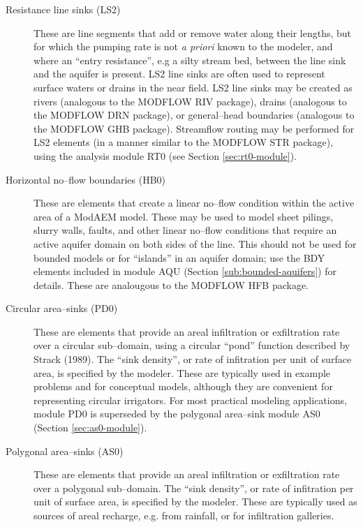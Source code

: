 \begin{description}
\item [{Resistance line sinks (\textsf{LS2})}] These are line segments that add or remove water along their lengths, but for which the pumping rate is not \emph{a priori} known to the modeler, and where an ``entry resistance'', e.g a silty stream bed, between the line sink and the aquifer is present. \textsf{LS2} line sinks are often used to represent surface waters or drains in the near field. \textsf{LS2} line sinks may be created as rivers (analogous to the MODFLOW RIV package), drains (analogous to the MODFLOW DRN package), or general--head boundaries (analogous to the MODFLOW GHB package). Streamflow routing may be performed for \textsf{LS2} elements (in a manner similar to the MODFLOW STR package), using the analysis module \textsf{RT0} (see Section \ref{sec:rt0-module}).

\item [{Horizontal no--flow boundaries (\textsf{HB0)}}] These are elements that create a linear no--flow condition within the active area of a ModAEM model. These may be used to model sheet pilings, slurry walls, faults, and other linear no--flow conditions that require an active aquifer domain on both sides of the line. This should not be used for bounded models or for ``islands'' in an aquifer domain; use the \textsf{BDY} elements included in module \textsf{AQU} (Section \ref{sub:bounded-aquifers}) for details. These are analougous to the MODFLOW HFB package.

\item [{Circular area--sinks (\textsf{PD0})}] These are elements that provide an areal infiltration or exfiltration rate over a circular sub--domain, using a circular ``pond'' function described by Strack (1989). The ``sink density'', or rate of infitration per unit of surface area, is specified by the modeler. These are typically used in example problems and for conceptual models, although they are convenient for representing circular irrigators. For most practical modeling applications, module \textsf{PD0} is superseded by the polygonal area--sink module \textsf{AS0} (Section \ref{sec:as0-module}).

\item [{Polygonal area--sinks (AS0)}] These are elements that provide an areal infiltration or exfiltration rate over a polygonal sub--domain. The ``sink density'', or rate of infitration per unit of surface area, is specified by the modeler. These are typically used as sources of areal recharge, e.g. from rainfall, or for infiltration galleries.
\end{description}
\newpage


